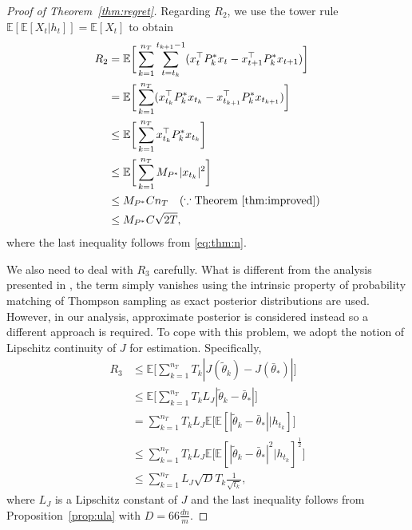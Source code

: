 \documentclass[11pt]{article}
\theoremstyle{plain}
\theoremstyle{definition}
\theoremstyle{remark}
\begin{document}
\begin{proof}[Proof of Theorem~\ref{thm:regret}]
Regarding $R_2$, we use the tower rule $\mathbb{E} [ \mathbb{E} [ X_t | h_t]] = \mathbb{E} [X_t]$ to obtain 
\begin{equation}\nonumber
\begin{split}
R_2 
&= \mathbb{E}\bigg[
\sum_{k=1}^{n_T} \sum_{t=t_k}^{t_{k+1} - 1} (
x_t^\top P^*_k x_t - 
x_{t+1}^\top P^*_k x_{t+1} 
)
\bigg ] \\
&= \mathbb{E} \bigg [
\sum_{k=1}^{n_T} (
x_{t_k}^\top P^*_k x_{t_k} - 
x_{t_{k+1}}^\top P^*_k x_{t_{k+1}}
)
\bigg ]\\
& \leq \mathbb{E} \bigg [
\sum_{k=1}^{n_T} 
x_{t_k}^\top P^*_k x_{t_k}
\bigg ]\\
&\leq  \mathbb{E} \bigg [
\sum_{k=1}^{n_T} 
M_{P^*} | x_{t_k}|^2
\bigg ]\\
&\leq M_{P^*} C n_T \quad (\because \mbox{Theorem~\ref{thm:improved}})\\
&\leq M_{P^*} C \sqrt{2T},
\end{split}
\end{equation}
where the last inequality follows from \eqref{eq:thm:n}. 

We also need to deal with $R_3$ carefully. What is different from the analysis presented in \cite{ouyang2019posterior}, the term simply vanishes using the intrinsic property of probability matching of Thompson sampling as exact posterior distributions are used. However, in our analysis, approximate posterior is considered instead so a different approach is required. To cope with this problem, we adopt the notion of Lipschitz continuity of $J$ for estimation. Specifically, 
\begin{equation}\nonumber
\begin{split}
R_3 &\leq \mathbb{E} \bigg [
\sum_{k=1}^{n_T} T_k |J (\tilde{\theta}_k) - J(\bar{\theta}_*)| 
\bigg ]\\
&\leq \mathbb{E} \bigg [
\sum_{k=1}^{n_T} T_k L_J  |\tilde{\theta}_k -  \bar{\theta}_*| 
\bigg ]\\
&= \sum_{k=1}^{n_T}  T_k L_J \mathbb{E} \big [ \mathbb{E} [
  |\tilde{\theta}_k -  \bar{\theta}_*|  | h_{t_k} ]
\big ] \\
& \leq \sum_{k=1}^{n_T}  T_k L_J \mathbb{E} \big [ \mathbb{E} [
  |\tilde{\theta}_k -  \bar{\theta}_*|^2  | h_{t_k} ]^{\frac{1}{2}}
\big ]\\
&\leq  \sum_{k=1}^{n_T} L_J \sqrt{D} T_k  \frac{1}{\sqrt{t_k}},
\end{split}
\end{equation}
where $L_J$ is a Lipschitz constant of $J$ and the last inequality follows from Proposition~\ref{prop:ula} with $D = 66\frac{dn}{m}$. 


\end{proof}
\end{document}
